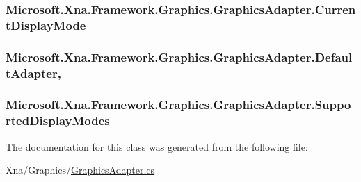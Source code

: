 \subsubsection[{Current\+Display\+Mode}]{ Microsoft.\+Xna.\+Framework.\+Graphics.\+Graphics\+Adapter.\+Current\+Display\+Mode\hspace{0.3cm}{\ttfamily [get]}}\label{class_microsoft_1_1_xna_1_1_framework_1_1_graphics_1_1_graphics_adapter_ad7bbb94c5f0464b782b916330c063c0e}
\hypertarget{class_microsoft_1_1_xna_1_1_framework_1_1_graphics_1_1_graphics_adapter_a8a5f2076de589bf7ddb6199d3c430ec2}{}
\subsubsection[{Default\+Adapter}]{ Microsoft.\+Xna.\+Framework.\+Graphics.\+Graphics\+Adapter.\+Default\+Adapter\hspace{0.3cm}{\ttfamily [static]}, {\ttfamily [get]}}\label{class_microsoft_1_1_xna_1_1_framework_1_1_graphics_1_1_graphics_adapter_a8a5f2076de589bf7ddb6199d3c430ec2}
\hypertarget{class_microsoft_1_1_xna_1_1_framework_1_1_graphics_1_1_graphics_adapter_a078436f88441fb7080d70bc1b7d8033b}{}
\subsubsection[{Supported\+Display\+Modes}]{ Microsoft.\+Xna.\+Framework.\+Graphics.\+Graphics\+Adapter.\+Supported\+Display\+Modes\hspace{0.3cm}{\ttfamily [get]}}\label{class_microsoft_1_1_xna_1_1_framework_1_1_graphics_1_1_graphics_adapter_a078436f88441fb7080d70bc1b7d8033b}


The documentation for this class was generated from the following file\+:\begin{DoxyCompactItemize}
\item 
Xna/\+Graphics/\hyperlink{_graphics_adapter_8cs}{Graphics\+Adapter.\+cs}\end{DoxyCompactItemize}
